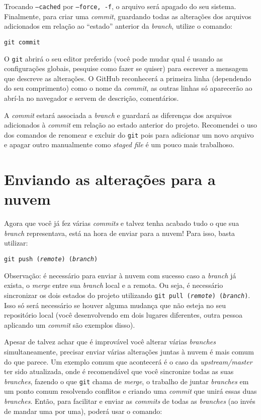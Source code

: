 \documentclass[a4paper,oneside,10pt]{memoir}
\begin{document}
Trocando \texttt{--cached} por \texttt{--force, -f}, o arquivo será apagado do
seu sistema.
\\

Finalmente, para criar uma \emph{commit}, guardando todas as alterações dos
arquivos adicionados em relação ao ``estado'' anterior da \emph{branch},
utilize o comando:

\begin{center}
\texttt{git commit}
\end{center}

O \texttt{git} abrirá o seu editor preferido (você pode mudar qual é usando as
configurações globais, pesquise como fazer se quiser) para escrever a mensagem
que descreve as alterações. O GitHub reconhecerá a primeira linha (dependendo
do seu comprimento) como o nome da \emph{commit}, as outras linhas só
aparecerão ao abrí-la no navegador e servem de descrição, comentários.

A \emph{commit} estará associada a \emph{branch} e guardará as diferenças dos
arquivos adicionados à \emph{commit} em relação ao estado anterior do projeto.
Recomendei o uso dos comandos de renomear e excluir do \texttt{git} pois para
adicionar um novo arquivo e apagar outro manualmente como \emph{staged file} é
um pouco mais trabalhoso.

\section{Enviando as alterações para a nuvem}

Agora que você já fez várias \emph{commits} e talvez tenha acabado tudo o que
sua \emph{branch} representava, está na hora de enviar para a nuvem! Para isso,
basta utilizar:

\begin{center}
\texttt{git push (\emph{remote}) (\emph{branch})}
\end{center}

Observação: é necessário para enviar à nuvem com sucesso caso a \emph{branch}
já exista, o \emph{merge} entre sua \emph{branch} local e a remota. Ou seja, é
necessário sincronizar os dois estados do projeto utilizando \texttt{git pull
(\emph{remote}) (\emph{branch})}. Isso só será necessário se houver alguma
mudança que não esteja no seu repositório local (você desenvolvendo em dois
lugares diferentes, outra pessoa aplicando um \emph{commit} são exemplos disso).

Apesar de talvez achar que é improvável você alterar várias \emph{branches}
simultaneamente, precisar enviar várias alterações juntas à nuvem é mais
comum do que parece. Um exemplo comum que acontecerá é o caso da
\emph{upstream/master} ter sido atualizada, onde é recomendável que você
sincronize todas as suas \emph{branches}, fazendo o que \texttt{git} chama de
\emph{merge}, o trabalho de juntar \emph{branches} em um ponto comum resolvendo
conflitos e criando uma \emph{commit} que unirá essas duas \emph{branches}.
Então, para facilitar e enviar as \emph{commits} de todas as \emph{branches} (ao
invés de mandar uma por uma), poderá usar o comando:
\end{document}
